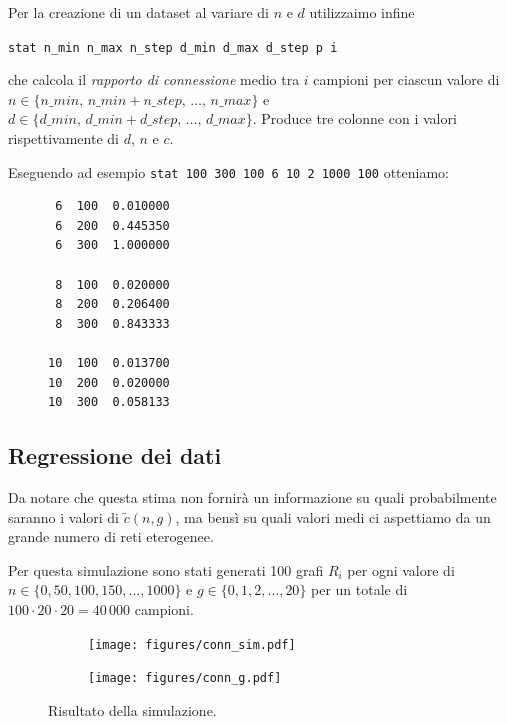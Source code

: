 \documentclass[a4paper,12pt]{article}
\theoremstyle{definition}
\begin{document}
Per la creazione di un dataset al variare di $n$ e $d$ utilizzaimo infine

\centerline{\texttt{stat n\_min n\_max n\_step d\_min d\_max d\_step p i}}

che calcola il \emph{rapporto di connessione} medio tra $i$ campioni per ciascun valore di $n \in \{n\_min,\,n\_min+n\_step,\,\dots,\,n\_max\}$ e $d \in \{d\_min,\,d\_min+d\_step,\,\dots,\,d\_max\}$. Produce tre colonne con i valori rispettivamente di $d$, $n$ e $c$.

Eseguendo ad esempio \texttt{stat 100 300 100 6 10 2 1000 100} otteniamo:

\begin{figure}[H]
\centering
\begin{BVerbatim}
 6  100  0.010000
 6  200  0.445350
 6  300  1.000000

 8  100  0.020000
 8  200  0.206400
 8  300  0.843333

10  100  0.013700
10  200  0.020000
10  300  0.058133
\end{BVerbatim}
\end{figure}

\subsection{Regressione dei dati}


Da notare che questa stima non fornirà un informazione su quali probabilmente saranno i valori di $\tilde{c}(n, g)$, ma bensì su quali valori medi ci aspettiamo da un grande numero di reti eterogenee.

Per questa simulazione sono stati generati 100 grafi $R_i$ per ogni valore di $n \in \{0, 50, 100, 150, \dots, 1000\}$ e $g \in \{0, 1, 2, \dots, 20\}$ per un totale di $100 \cdot 20 \cdot 20 = 40\,000$ campioni.

\begin{figure}[H]
\begin{subfigure}[b]{0.5\textwidth}
\texttt{[image: figures/conn\_sim.pdf]}
\caption{}
\end{subfigure}
\begin{subfigure}[b]{0.5\textwidth}
\texttt{[image: figures/conn\_g.pdf]}
\caption{}
\end{subfigure}
\caption{Risultato della simulazione.}%
\end{figure}
\end{document}

